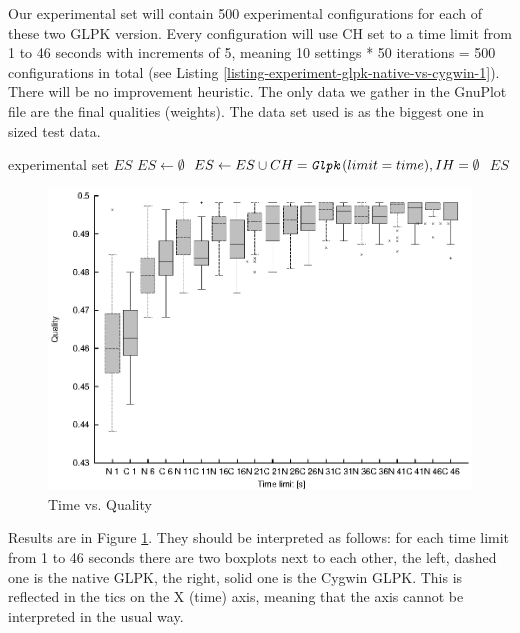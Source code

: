 Our experimental set will contain 500 experimental configurations for each of these two GLPK version. Every configuration will use  CH set to a time limit from 1 to 46 seconds with increments of 5, meaning 10 settings * 50 iterations = 500 configurations in total (see Listing \ref{listing-experiment-glpk-native-vs-cygwin-1}). There will be no improvement heuristic. The only data we gather in the GnuPlot file are the final qualities (weights). The data set used is  as the biggest one in sized test data.

\begin{algorithm}
\caption{GLPK: native vs. Cygwin set generation 1}
\label{listing-experiment-glpk-native-vs-cygwin-1}
\begin{algorithmic}
\ENSURE experimental set $ES$
\STATE $ES \gets \emptyset$
    \STATE $ES \gets ES \cup {CH = \texttt{\textit{Glpk}}(limit = time), IH = \emptyset}$
  \ENDFOR
\ENDFOR
\RETURN $ES$
\end{algorithmic}
\end{algorithm}

\begin{figure}
  \caption{Time vs. Quality}
  \label{image-experiment-time-vs-quality}
  \centering
    \includegraphics[width=\textwidth]{images/experiments/time-vs-quality}
\end{figure}

Results are in Figure \ref{image-experiment-time-vs-quality}. They should be interpreted as follows: for each time limit from 1 to 46 seconds there are two boxplots next to each other, the left, dashed one is the native GLPK, the right, solid one is the Cygwin GLPK. This is reflected in the tics on the X (time) axis, meaning that the axis cannot be interpreted in the usual way.

